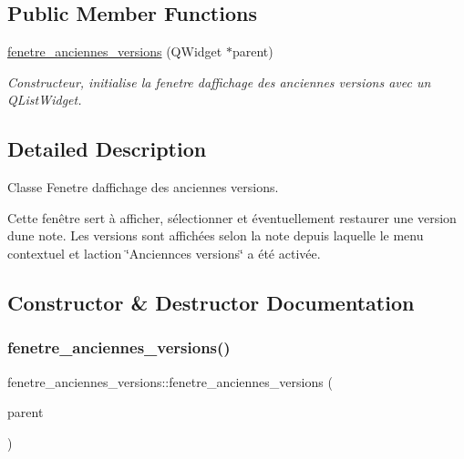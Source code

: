 \subsection*{Public Member Functions}
\begin{DoxyCompactItemize}
\item 
\hyperlink{classfenetre__anciennes__versions_a4e97516e26d1506c22fade6a4a641c45}{fenetre\+\_\+anciennes\+\_\+versions} (Q\+Widget $\ast$parent)
\begin{DoxyCompactList}\small\item\em Constructeur, initialise la fenetre d\textquotesingle{}affichage des anciennes versions avec un Q\+List\+Widget. \end{DoxyCompactList}\end{DoxyCompactItemize}


\subsection{Detailed Description}
Classe Fenetre d\textquotesingle{}affichage des anciennes versions. 

Cette fenêtre sert à afficher, sélectionner et éventuellement restaurer une version d\textquotesingle{}une note. Les versions sont affichées selon la note depuis laquelle le menu contextuel et l\textquotesingle{}action \char`\"{}\+Anciennces versions\char`\"{} a été activée. 

\subsection{Constructor \& Destructor Documentation}
\mbox{\label{classfenetre__anciennes__versions_a4e97516e26d1506c22fade6a4a641c45}} 
\subsubsection{\texorpdfstring{fenetre\+\_\+anciennes\+\_\+versions()}{fenetre\_anciennes\_versions()}}
{\footnotesize\ttfamily fenetre\+\_\+anciennes\+\_\+versions\+::fenetre\+\_\+anciennes\+\_\+versions (\begin{DoxyParamCaption}\item[{Q\+Widget $\ast$}]{parent }\end{DoxyParamCaption})}



